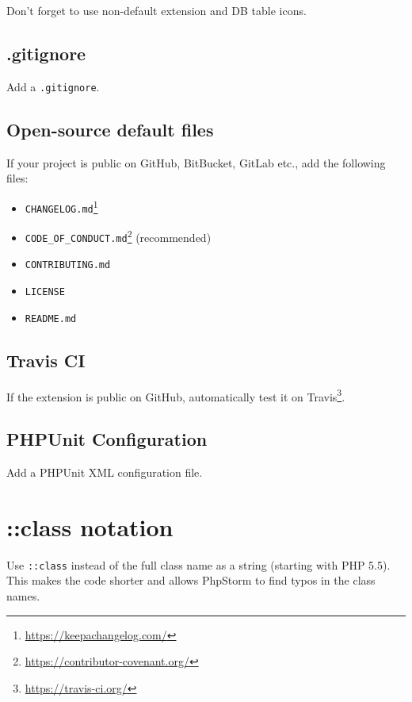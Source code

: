 Don't forget to use non-default extension and DB table icons.

\subsection{.gitignore}

Add a \texttt{.gitignore}.

\subsection{Open-source default files}

If your project is public on GitHub, BitBucket, GitLab etc., add the following files:

\begin{itemize}
  \item \texttt{CHANGELOG.md}\footnote{\url{https://keepachangelog.com/}}
  \item \texttt{CODE\_OF\_CONDUCT.md}\footnote{\url{https://contributor-covenant.org/}} (recommended)
  \item \texttt{CONTRIBUTING.md}
  \item \texttt{LICENSE}
  \item \texttt{README.md}
\end{itemize}

\subsection{Travis CI}

If the extension is public on GitHub, automatically test it on Travis\footnote{\url{https://travis-ci.org/}}.

\subsection{PHPUnit Configuration}

Add a PHPUnit XML configuration file.

\section{::class notation}

Use \texttt{::class} instead of the full class name as a string (starting with PHP 5.5). This makes the code shorter and allows PhpStorm to find typos in the class names.

